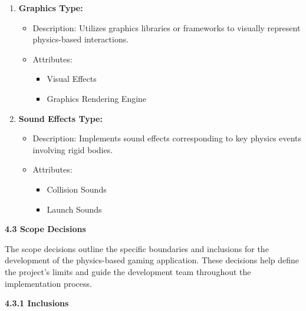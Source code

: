 \documentclass[
]{article}
\begin{document}
\begin{enumerate}
\def\labelenumi{\arabic{enumi}.}
\setcounter{enumi}{10}
\item
  \textbf{Graphics Type:}

  \begin{itemize}
  \item
    Description: Utilizes graphics libraries or frameworks to visually
    represent physics-based interactions.
  \item
    Attributes:

    \begin{itemize}
    \item
      Visual Effects
    \item
      Graphics Rendering Engine
    \end{itemize}
  \end{itemize}
\item
  \textbf{Sound Effects Type:}

  \begin{itemize}
  \item
    Description: Implements sound effects corresponding to key physics
    events involving rigid bodies.
  \item
    Attributes:

    \begin{itemize}
    \item
      Collision Sounds
    \item
      Launch Sounds
    \end{itemize}
  \end{itemize}
\end{enumerate}

\textbf{4.3 Scope Decisions}

The scope decisions outline the specific boundaries and inclusions for
the development of the physics-based gaming application. These decisions
help define the project's limits and guide the development team
throughout the implementation process.

\textbf{4.3.1 Inclusions}
\end{document}
